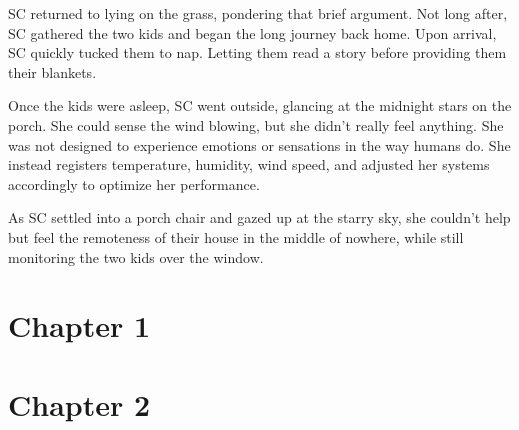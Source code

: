 \documentclass[12pt]{book}
\begin{document}
\clearpage

SC returned to lying on the grass, pondering that brief
argument. Not long after, SC gathered the two kids and
began the long journey back home. Upon arrival, SC
quickly tucked them to nap. Letting them read a story
before providing them their blankets.

Once the kids were asleep, SC went outside, glancing at
the midnight stars on the porch. She could sense the wind
blowing, but she didn't really feel anything. She was not
designed to experience emotions or sensations in the way
humans do. She instead registers temperature, humidity,
wind speed, and adjusted her systems accordingly to
optimize her performance.

As SC settled into a porch chair and gazed up at the
starry sky, she couldn't help but feel the remoteness of
their house in the middle of nowhere, while still
monitoring the two kids over the window.

\section*{Chapter 1}

\section*{Chapter 2}
\end{document}

